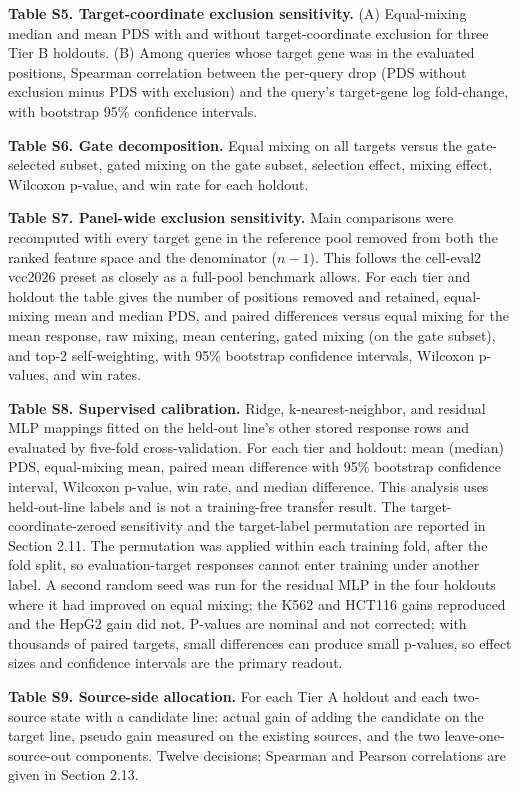 \documentclass[12pt]{article}
\begin{document}
\begin{singlespace}
\noindent\textbf{Table S5. Target-coordinate exclusion sensitivity.} (A) Equal-mixing median and mean PDS with and without target-coordinate exclusion for three Tier B holdouts. (B) Among queries whose target gene was in the evaluated positions, Spearman correlation between the per-query drop (PDS without exclusion minus PDS with exclusion) and the query's target-gene log fold-change, with bootstrap 95\% confidence intervals.

\noindent\textbf{Table S6. Gate decomposition.} Equal mixing on all targets versus the gate-selected subset, gated mixing on the gate subset, selection effect, mixing effect, Wilcoxon p-value, and win rate for each holdout.

\noindent\textbf{Table S7. Panel-wide exclusion sensitivity.} Main comparisons were recomputed with every target gene in the reference pool removed from both the ranked feature space and the denominator ($n-1$). This follows the cell-eval2 vcc2026 preset as closely as a full-pool benchmark allows. For each tier and holdout the table gives the number of positions removed and retained, equal-mixing mean and median PDS, and paired differences versus equal mixing for the mean response, raw mixing, mean centering, gated mixing (on the gate subset), and top-2 self-weighting, with 95\% bootstrap confidence intervals, Wilcoxon p-values, and win rates.

\noindent\textbf{Table S8. Supervised calibration.} Ridge, k-nearest-neighbor, and residual MLP mappings fitted on the held-out line's other stored response rows and evaluated by five-fold cross-validation. For each tier and holdout: mean (median) PDS, equal-mixing mean, paired mean difference with 95\% bootstrap confidence interval, Wilcoxon p-value, win rate, and median difference. This analysis uses held-out-line labels and is not a training-free transfer result. The target-coordinate-zeroed sensitivity and the target-label permutation are reported in Section 2.11. The permutation was applied within each training fold, after the fold split, so evaluation-target responses cannot enter training under another label. A second random seed was run for the residual MLP in the four holdouts where it had improved on equal mixing; the K562 and HCT116 gains reproduced and the HepG2 gain did not. P-values are nominal and not corrected; with thousands of paired targets, small differences can produce small p-values, so effect sizes and confidence intervals are the primary readout.

\noindent\textbf{Table S9. Source-side allocation.} For each Tier A holdout and each two-source state with a candidate line: actual gain of adding the candidate on the target line, pseudo gain measured on the existing sources, and the two leave-one-source-out components. Twelve decisions; Spearman and Pearson correlations are given in Section 2.13.


\end{singlespace}
\end{document}
